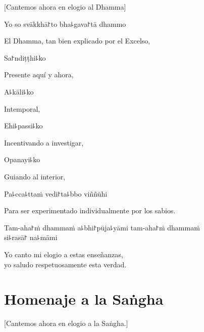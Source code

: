 \begin{english}
  [Cantemos ahora en elogio al Dhamma]
\end{english}

Yo so svākkhā꜓to bha꜕gava꜓tā dhammo

\begin{english}
  El Dhamma, tan bien explicado por el Excelso,
\end{english}

Sa꜓ndiṭṭhi꜕ko

\begin{english}
  Presente aquí y ahora,
\end{english}

A꜕kāli꜕ko

\begin{english}
  Intemporal,
\end{english}

Ehi꜕passi꜕ko

\begin{english}
  Incentivando a investigar,
\end{english}

Opanayi꜕ko

\begin{english}
  Guiando al interior,
\end{english}

Pa꜕cca꜕ttaṁ vedi꜓ta꜕bbo viññūhi

\begin{english}
  Para ser experimentado individualmente por los sabios.
\end{english}

Tam-aha꜓ṁ dhammaṁ a꜕bhi꜓pūja꜕yāmi tam-aha꜓ṁ dhammaṁ \\si꜕rasā꜓ na꜕māmi

\begin{english}
  Yo canto mi elogio a estas enseñanzas,\\
  yo saludo respetuosamente esta verdad.
\end{english}

\clearpage

\chapter{Homenaje a la Saṅgha}

\begin{leader}
\end{leader}

\begin{english}
  [Cantemos ahora en elogio a la Saṅgha.]
\end{english}

